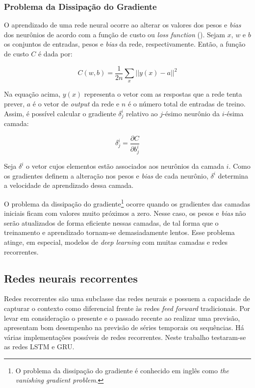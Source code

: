\subsubsection{Problema da Dissipação do Gradiente}
\label{sec:vanishing_gradient_problem}

O aprendizado de uma rede neural ocorre ao alterar os valores dos pesos
e \textit{bias} dos neurônios de acordo com a função de custo ou \textit{loss function} (\cite{neuralnetworksanddeeplearning}). 
Sejam $x$, $w$ e $b$ os conjuntos de entradas,
pesos e \textit{bias} da rede, respectivamente. Então, a função de custo $C$ é dada por:

\begin{equation}
  C(w,b) = \frac{1}{2n}\sum_x || y(x) - a ||^2
\label{eq:func_custo}
\end{equation}

Na equação acima, $y(x)$ representa o vetor com as respostas
que a rede tenta prever, $a$ é o vetor de \textit{output} da rede e 
$n$ é o número total de entradas de treino. Assim, é possível calcular o gradiente $\delta_j^i$
relativo ao $j$-ésimo neurônio da $i$-ésima camada:

\begin{equation}
  \delta_j^i = \frac{\partial C}{\partial b_j^i}
\label{eq:func_grad}
\end{equation}

Seja $\delta^i$ o vetor cujos elementos estão associados
aos neurônios da camada $i$. Como os gradientes definem a alteração nos pesos 
e \textit{bias}
de cada neurônio,  $\delta^i$  determina a velocidade de aprendizado dessa camada.

O problema da dissipação do gradiente\footnote{O problema da dissipação do gradiente 
é conhecido em inglês como \textit{the vanishing gradient problem}.
} ocorre quando os gradientes das camadas iniciais ficam com valores 
muito próximos a zero. Nesse caso, os pesos e \textit{bias} não serão atualizados
de forma eficiente nessas camadas, de tal forma que o treinamento e aprendizado
tornam-se demasiadamente lentos. Esse problema atinge, em especial, modelos 
de \textit{deep learning} com muitas camadas e redes recorrentes.
        
\subsection{Redes neurais recorrentes}
\label{rnn}

Redes recorrentes são uma subclasse das redes neurais e possuem a capacidade
de capturar o contexto como diferencial frente às redes \textit{feed forward}
tradicionais. Por levar em consideração o presente e o passado recente ao 
realizar uma previsão, apresentam bom desempenho na previsão de séries 
temporais ou sequências. Há várias implementações possíveis de redes 
recorrentes. Neste trabalho testaram-se as redes LSTM e GRU.

